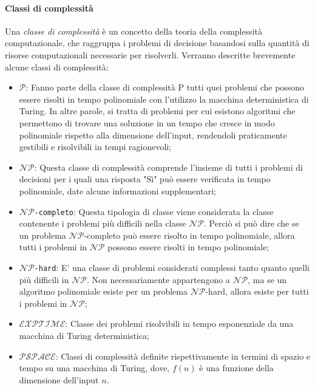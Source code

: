 \documentclass{article}
\theoremstyle{definition}
\begin{document}
\paragraph{Classi di complessità}
Una \emph{classe di complessità} è un concetto della teoria della complessità computazionale, che raggruppa i problemi di decisione basandosi sulla quantità di risorse computazionali necessarie per risolverli.
Verranno descritte brevemente alcune classi di complessità:
\begin{itemize}[label={\textbullet}]
  \item \texttt{$\mathcal{P}$}: Fanno parte della classe di complessità P tutti quei problemi che possono essere risolti in tempo polinomiale con l'utilizzo la macchina deterministica di Turing. In altre parole, si tratta di problemi per cui esistono algoritmi che permettono di trovare una soluzione in un tempo che cresce in modo polinomiale rispetto alla dimensione dell'input, rendendoli praticamente gestibili e risolvibili in tempi ragionevoli;
  \item \texttt{$\mathcal{NP}$}: Questa classe di complessità comprende l'insieme di tutti i problemi di decisioni per i quali una risposta "Sì" può essere verificata in tempo polinomiale, date alcune informazioni supplementari;
  \item \texttt{$\mathcal{NP}$-completo}: Questa tipologia di classe viene considerata la classe contenente i problemi più difficili nella classe {$\mathcal{NP}$}. Perciò si può dire che se un problema {$\mathcal{NP}$-completo} può essere risolto in tempo polinomiale, allora tutti i problemi in {$\mathcal{NP}$} possono essere risolti in tempo polinomiale;
  \item \texttt{$\mathcal{NP}$-hard}: E' una classe di problemi considerati complessi tanto quanto quelli più difficili in {$\mathcal{NP}$}. Non necessariamente appartengono a {$\mathcal{NP}$}, ma se un algoritmo polinomiale esiste per un problema {$\mathcal{NP}$-hard}, allora esiste per tutti i problemi in {$\mathcal{NP}$};
  \item \texttt{$\mathcal{EXPTIME}$}: Classe dei problemi risolvibili in tempo esponenziale da una macchina di Turing deterministica;
  \item \texttt{$\mathcal{PSPACE}$}: Classi di complessità definite rispettivamente in termini di spazio e tempo su una macchina di Turing, dove, $f(n)$ è una funzione della dimensione dell'input $n$.
\end{itemize}
\end{document}
